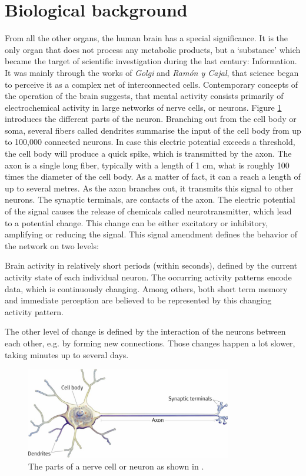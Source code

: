 \documentclass[10pt,a4paper,DIV=11]{scrreprt}
\begin{document}
\section{Biological background}
From all the other organs, the human brain has a special significance. It is the only organ that does not process any metabolic products, but a ‘substance’ which became the target of scientific investigation during the last century: Information. It was mainly through the works of \textit{Golgi} and \textit{Ramón y Cajal}, that science began to perceive it as a complex net of interconnected cells.  Contemporary concepts of the operation of the brain suggests, that mental activity consists primarily of electrochemical activity in large networks of nerve cells, or neurons. 
Figure \ref{fig:neuron} introduces the different parts of the neuron. Branching out from the cell body or soma, several fibers called dendrites summarise the input of the cell body from up to 100,000 connected neurons. In case this electric potential exceeds a threshold, the cell body will produce a quick spike, which is transmitted by the axon. The axon is a single long fiber, typically with a length of 1 cm, what is roughly 100 times the diameter of the cell body. As a matter of fact, it can a reach a length of up to several metres. As the axon branches out, it transmits this signal to other neurons. The synaptic terminals, are contacts of the axon. The electric potential of the signal causes the release of chemicals called neurotransmitter, which lead to a potential change. This change can be either excitatory or inhibitory, amplifying or reducing the signal. This signal amendment defines the behavior of the network on two levels: 

Brain activity in relatively short periods (within seconds), defined by the current activity state of each individual neuron. The occurring activity patterns encode data, which is continuously changing. Among others, both short term memory and immediate perception are believed to be represented by this changing activity pattern.

The other level of change is defined by the interaction of the neurons between each other, e.g. by forming new connections. Those changes happen a lot slower, taking minutes up to several days.\cite{NEUINF} 

\begin{center}
\begin{figure}
\includegraphics[width=0.8\textwidth,scale=1]{files/neuron.jpg}  
\caption{The parts of a nerve cell or neuron as shown in \cite{NEU}.}
\label{fig:neuron}
\end{figure}
\end{center}
\end{document}
